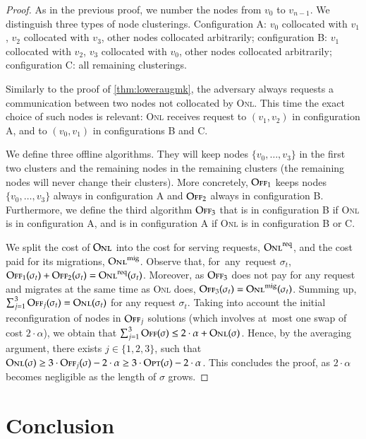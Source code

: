 \documentclass[11pt,a4paper]{scrartcl}
\newcommand{\ONL}{\textsc{Onl}\xspace}
\newcommand{\ONLreq}{\textsc{Onl}^\textnormal{req}\xspace}
\newcommand{\ONLmig}{\textsc{Onl}^\textnormal{mig}\xspace}
\newcommand{\OFF}{\textsc{Off}\xspace}
\newcommand{\OPT}{\textsc{Opt}\xspace}
\begin{document}
\begin{proof} As in the previous proof, we number the nodes from $v_0$ to
$v_{n-1}$. We distinguish three types of node clusterings. Configuration A:
$v_0$ collocated with $v_1$, $v_2$ collocated with $v_3$, other nodes
collocated arbitrarily; configuration B: $v_1$ collocated with $v_2$, $v_3$
collocated with $v_0$, other nodes collocated arbitrarily; configuration C:
all remaining clusterings.

Similarly to the proof of \cref{thm:loweraugmk}, the adversary always
requests a communication between two nodes not collocated by \ONL.
This time the exact choice of such nodes is relevant: \ONL receives request to
$(v_1,v_2)$ in configuration A, and to $(v_0,v_1)$ in configurations B and C.

We define three offline algorithms. They will keep nodes
$\{v_0,\ldots,v_3\}$ in the first two clusters and the remaining nodes in the
remaining clusters (the remaining nodes will never change their clusters). 
More concretely, $\OFF_1$ keeps nodes $\{v_0,\ldots,v_3\}$ always in
configuration A and $\OFF_2$ always in configuration B. Furthermore, we define
the third algorithm $\OFF_3$ that is in configuration B if \ONL is in
configuration A, and is in configuration A if \ONL is in configuration B or C.

We split the cost of $\ONL$ into the cost for serving requests, $\ONLreq$, and
the cost paid for its migrations, $\ONLmig$. Observe that, for~any~request
$\sigma_t$, $\OFF_1(\sigma_t) + \OFF_2(\sigma_t) = \ONLreq(\sigma_t)$.
Moreover, as $\OFF_3$ does not pay for any request and migrates at the same
time as \ONL does, $\OFF_3(\sigma_t) = \ONLmig(\sigma_t)$. Summing up,
$\sum_{j=1}^3 \OFF_j(\sigma_t) = \ONL(\sigma_t)$ for any request $\sigma_t$.
Taking into account the initial reconfiguration of nodes in $\OFF_j$ solutions
(which involves at~most one swap of cost $2 \cdot \alpha$), we obtain that
$\sum_{j=1}^3 \OFF(\sigma) \leq 2 \cdot \alpha + \ONL(\sigma)$. Hence, by the
averaging argument, there exists $j \in \{1,2,3\}$, such that $\ONL(\sigma)
\geq 3 \cdot \OFF_j(\sigma) - 2 \cdot \alpha \geq 3 \cdot \OPT(\sigma) - 
2 \cdot \alpha$. This concludes the proof, as $2 \cdot \alpha$ becomes
negligible as the length of $\sigma$ grows.
\end{proof}

\section{Conclusion}
\label{sec:conclusion}
\end{document}
